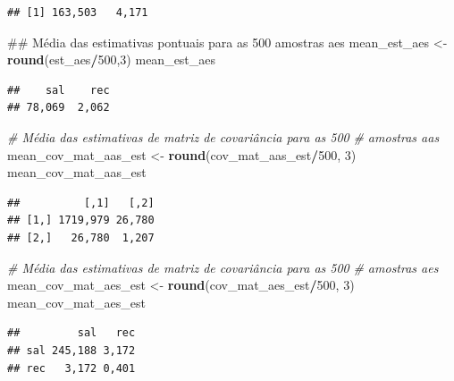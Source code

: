 \documentclass[]{book}
\newenvironment{Shaded}{\begin{snugshade}}{\end{snugshade}}
\newcommand{\KeywordTok}[1]{\textcolor[rgb]{0.13,0.29,0.53}{\textbf{#1}}}
\newcommand{\DecValTok}[1]{\textcolor[rgb]{0.00,0.00,0.81}{#1}}
\newcommand{\StringTok}[1]{\textcolor[rgb]{0.31,0.60,0.02}{#1}}
\newcommand{\CommentTok}[1]{\textcolor[rgb]{0.56,0.35,0.01}{\textit{#1}}}
\newcommand{\OperatorTok}[1]{\textcolor[rgb]{0.81,0.36,0.00}{\textbf{#1}}}
\newcommand{\NormalTok}[1]{#1}
\theoremstyle{definition}
\theoremstyle{definition}
\theoremstyle{definition}
\theoremstyle{remark}
\begin{document}
\begin{verbatim}
## [1] 163,503   4,171
\end{verbatim}

\begin{Shaded}
\begin{Highlighting}[]
\NormalTok{## Média das estimativas pontuais para as 500 amostras aes}
\NormalTok{mean_est_aes <-}\StringTok{ }\KeywordTok{round}\NormalTok{(est_aes}\OperatorTok{/}\DecValTok{500}\NormalTok{,}\DecValTok{3}\NormalTok{)}
\NormalTok{mean_est_aes}
\end{Highlighting}
\end{Shaded}

\begin{verbatim}
##    sal    rec 
## 78,069  2,062
\end{verbatim}

\begin{Shaded}
\begin{Highlighting}[]
\CommentTok{# Média das estimativas de matriz de covariância para as 500}
\CommentTok{# amostras aas}
\NormalTok{mean_cov_mat_aas_est <-}\StringTok{ }\KeywordTok{round}\NormalTok{(cov_mat_aas_est}\OperatorTok{/}\DecValTok{500}\NormalTok{, }\DecValTok{3}\NormalTok{)}
\NormalTok{mean_cov_mat_aas_est}
\end{Highlighting}
\end{Shaded}

\begin{verbatim}
##          [,1]   [,2]
## [1,] 1719,979 26,780
## [2,]   26,780  1,207
\end{verbatim}

\begin{Shaded}
\begin{Highlighting}[]
\CommentTok{# Média das estimativas de matriz de covariância para as 500}
\CommentTok{# amostras aes}
\NormalTok{mean_cov_mat_aes_est <-}\StringTok{ }\KeywordTok{round}\NormalTok{(cov_mat_aes_est}\OperatorTok{/}\DecValTok{500}\NormalTok{, }\DecValTok{3}\NormalTok{)}
\NormalTok{mean_cov_mat_aes_est}
\end{Highlighting}
\end{Shaded}

\begin{verbatim}
##         sal   rec
## sal 245,188 3,172
## rec   3,172 0,401
\end{verbatim}
\end{document}
